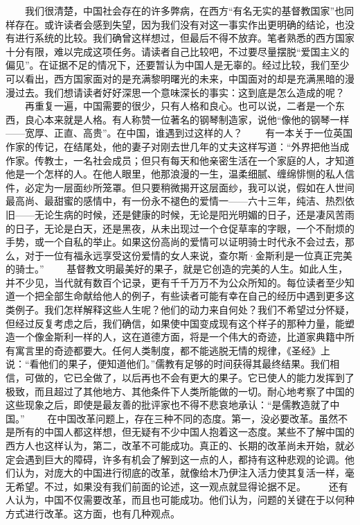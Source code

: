 \documentclass[12pt,oneside]{book}
\begin{document}
\begin{common-format}
　　我们很清楚，中国社会存在的许多弊病，在西方“有名无实的基督教国家”也同样存在。或许读者会感到失望，因为我们没有对这一事实作出更明确的结论，也没有进行系统的比较。我们确曾这样想过，但最后不得不放弃。笔者熟悉的西方国家十分有限，难以完成这项任务。请读者自己比较吧，不过要尽量摆脱“爱国主义的偏见”。在证据不足的情况下，还要暂认为中国人是无辜的。经过比较，我们至少可以看出，西方国家面对的是充满黎明曙光的未来，中国面对的却是充满黑暗的漫漫过去。我们想请读者好好深思一个意味深长的事实：这到底是怎么造成的呢？ 
　　再重复一遍，中国需要的很少，只有人格和良心。也可以说，二者是一个东西，良心本来就是人格。有人称赞一位著名的钢琴制造家，说他“像他的钢琴一样——宽厚、正直、高贵”。在中国，谁遇到过这样的人？ 
　　有一本关于一位英国作家的传记，在结尾处，他的妻子对刚去世几年的丈夫这样写道：“外界把他当成作家。传教士，一名社会成员；但只有每天和他亲密生活在一个家庭的人，才知道他是一个怎样的人。在他人眼里，他那浪漫的一生，温柔细腻、缠绵悱恻的私人信件，必定为一层面纱所笼罩。但只要稍微揭开这层面纱，我可以说，假如在人世间最高尚、最甜蜜的感情中，有一份永不褪色的爱情一——六十三年，纯洁、热烈依旧——无论生病的时候，还是健康的时候，无论是阳光明媚的日子，还是凄风苦雨的日子，无论是白天，还是黑夜，从未出现过一个仓促草率的字眼，一个不耐烦的手势，或一个自私的举止。如果这份高尚的爱情可以证明骑士时代永不会过去，那么，对于一位有福永远享受这份爱情的女人来说，查尔斯·金斯利是一位真正完美的骑士。” 
　　基督教文明最美好的果子，就是它创造的完美的人生。如此人生，并不少见，当代就有数百个记录，更有千千万万不为公众所知的。每位读者至少知道一个把全部生命献给他人的例子，有些读者可能有幸在自己的经历中遇到更多这类例子。我们怎样解释这些人生呢？他们的动力来自何处？我们不希望过分怀疑，但经过反复考虑之后，我们确信，如果使中国变成现有这个样子的那种力量，能塑造一个像金斯利一样的人，这在道德方面，将是一个伟大的奇迹，比道家典籍中所有寓言里的奇迹都要大。任何人类制度，都不能逃脱无情的规律，《圣经》上说：“看他们的果子，便知道他们。”儒教有足够的时间获得其最终结果。我们相信，可做的，它已全做了，以后再也不会有更大的果子。它已使人的能力发挥到了极致，而且超过了其他地方、其他条件下人类所能做的一切。耐心地考察了中国的这些现象之后，即使是最友善的批评家也不得不悲哀地承认：“是儒教造就了中国。” 
　　在中国改革问题上，存在三种不同的态度。第一，没必要改革。虽然不是所有的中国人都这样想，但无疑有不少中国人抱着这一态度。某些不了解中国的西方人也这样认为，第二，改革不可能成功。真正的、长期的改革尚未开始，就必定会遇到巨大的障碍，许多有机会了解到这一点的人，都持有这种悲观的论调。他们认为，对庞大的中国进行彻底的改革，就像给木乃伊注入活力使其复活一样，毫无希望。不过，如果没有我们前面的论述，这一观点就显得论据不足。 
　　还有人认为，中国不仅需要改革，而且也可能成功。他们认为，问题的关键在于以何种方式进行改革。这方面，也有几种观点。 

\end{common-format}
\end{document}

